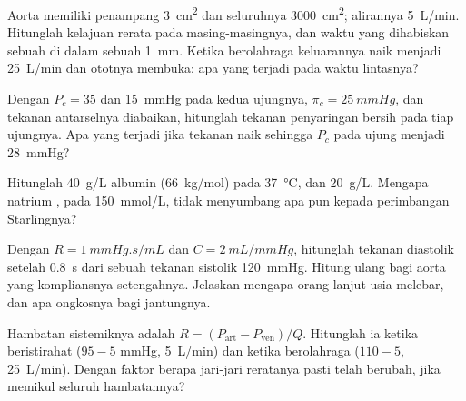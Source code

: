\begin{exercise}[$\star\star$]\label{exo:b2:blood-circulation:7}
Aorta memiliki penampang \qty{3}{cm^2} dan  seluruhnya
\qty{3000}{cm^2}; alirannya \qty{5}{L/min}. Hitunglah kelajuan rerata
pada masing-masingnya, dan waktu yang dihabiskan sebuah 
di dalam sebuah  \qty{1}{mm}. Ketika berolahraga keluarannya
naik menjadi \qty{25}{L/min} dan  ototnya membuka: apa yang
terjadi pada waktu lintasnya?
\end{exercise}

\begin{exercise}[$\star\star$]\label{exo:b2:blood-circulation:8}
Dengan $P_c = 35$ dan \qty{15}{mmHg} pada kedua ujungnya, $\pi_c =
\qty{25}{mmHg}$, dan tekanan antarselnya diabaikan, hitunglah tekanan
penyaringan bersih pada tiap ujungnya. Apa yang terjadi jika tekanan
 naik sehingga $P_c$ pada ujung  menjadi \qty{28}{mmHg}?
\end{exercise}

\begin{exercise}[$\star\star$]\label{exo:b2:blood-circulation:9}
Hitunglah  \qty{40}{g/L} albumin (\qty{66}{kg/mol}) pada
\qty{37}{\celsius}, dan \qty{20}{g/L}. Mengapa natrium , pada
\qty{150}{mmol/L}, tidak menyumbang apa pun kepada perimbangan
Starlingnya?
\end{exercise}

\begin{exercise}[$\star\star\star$]\label{exo:b2:blood-circulation:10}
Dengan $R = \qty{1}{mmHg.s/mL}$ dan $C = \qty{2}{mL/mmHg}$, hitunglah
tekanan diastolik setelah \qty{0.8}{s} dari sebuah tekanan sistolik
\qty{120}{mmHg}. Hitung ulang bagi aorta yang kompliansnya setengahnya.
Jelaskan mengapa  orang lanjut usia melebar, dan apa
ongkosnya bagi jantungnya.
\end{exercise}

\begin{exercise}[$\star\star\star$]\label{exo:b2:blood-circulation:11}
Hambatan sistemiknya adalah $R = (P_{\text{art}} - P_{\text{ven}})/Q$.
Hitunglah ia ketika beristirahat ($95 - 5$ mmHg, \qty{5}{L/min}) dan
ketika berolahraga ($110 - 5$, \qty{25}{L/min}). Dengan faktor berapa
jari-jari  reratanya pasti telah berubah, jika 
memikul seluruh hambatannya?
\end{exercise}

